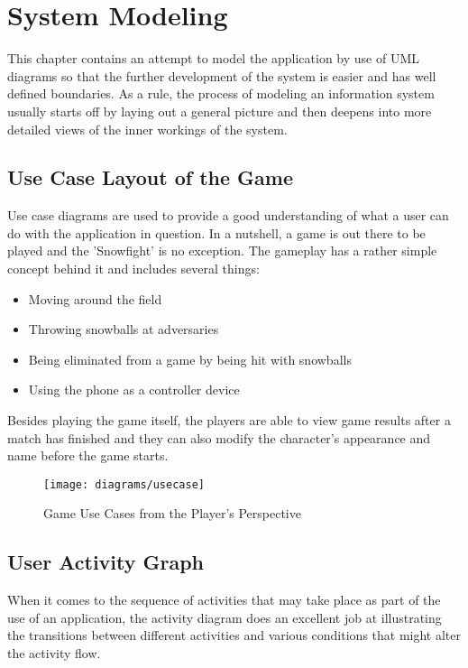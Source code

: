 \section{System Modeling}


This chapter contains an attempt to model the application by use of UML
diagrams so that the further development of the system is easier and has well
defined boundaries. As a rule, the process of modeling an information system
usually starts off by laying out a general picture and then deepens into more
detailed views of the inner workings of the system.


\subsection{Use Case Layout of the Game}

Use case diagrams are used to provide a good understanding of what a user can
do with the application in question. In a nutshell, a game is out there to be
played and the 'Snowfight' is no exception. The gameplay has a rather simple
concept behind it and includes several things:

\begin{itemize}
	\item Moving around the field
	\item Throwing snowballs at adversaries
	\item Being eliminated from a game by being hit with snowballs
	\item Using the phone as a controller device
\end{itemize}

Besides playing the game itself, the players are able to view game results after
a match has finished and they can also modify the character's appearance and
name before the game starts.

\begin{figure}[!h]
\centering
\texttt{[image: diagrams/usecase]}
\caption{Game Use Cases from the Player's Perspective}\label{diag:usecase}
\end{figure}

\newpage

\subsection{User Activity Graph}

When it comes to the sequence of activities that may take place as part of the
use of an application, the activity diagram does an excellent job at
illustrating the transitions between different activities and various conditions
that might alter the activity flow.

